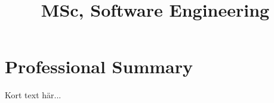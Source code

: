 \documentclass[11pt,a4paper,sans]{moderncv}
\title{MSc, Software Engineering}
\begin{document}
\makecvtitle

\section{Professional Summary}
Kort text här...
\end{document}

